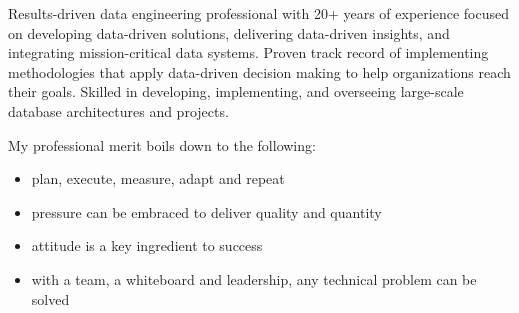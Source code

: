 %
%
%
\vspace{-5ex}
\par{
Results-driven data engineering professional with 20+ years of experience focused on developing data-driven solutions, delivering data-driven insights, and integrating mission-critical data systems. Proven track record of implementing methodologies that apply data-driven decision making to help organizations reach their goals. Skilled in developing, implementing, and overseeing large-scale database architectures and projects.

My professional merit boils down to the following:
\begin{itemize}
  \item plan, execute, measure, adapt and repeat
  \item pressure can be embraced to deliver quality and quantity
  \item attitude is a key ingredient to success
  \item with a team, a whiteboard and leadership, any technical problem can be solved
\end{itemize}

\medskip

}